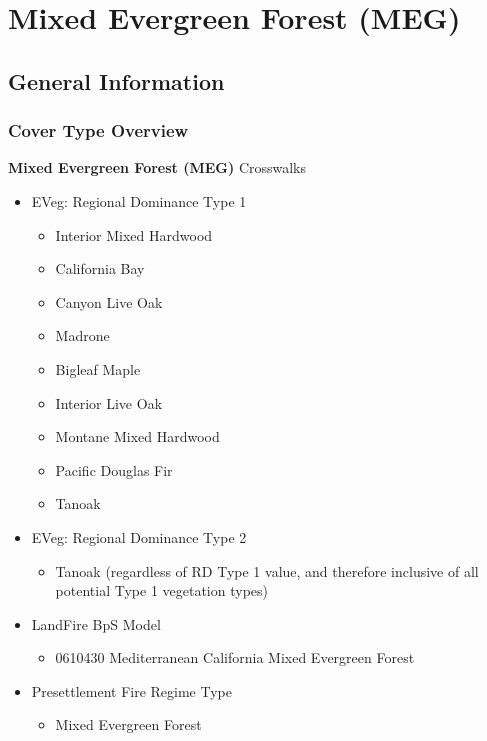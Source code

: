 \newpage
\section{Mixed Evergreen Forest (MEG)}

\subsection*{General Information}

\subsubsection{Cover Type Overview}

\textbf{Mixed Evergreen Forest (MEG)}
\newline
Crosswalks
\begin{itemize}
	\item EVeg: Regional Dominance Type 1
	\begin{itemize}
		\item Interior Mixed Hardwood
		\item California Bay
		\item Canyon Live Oak
		\item Madrone
		\item Bigleaf Maple
		\item Interior Live Oak
		\item Montane Mixed Hardwood 
		\item Pacific Douglas Fir
		\item Tanoak
	\end{itemize}

	\item EVeg: Regional Dominance Type 2
	\begin{itemize}
		\item Tanoak (regardless of RD Type 1 value, and therefore inclusive of all potential Type 1 vegetation types)
	\end{itemize}

	\item LandFire BpS Model
	\begin{itemize}
		\item 0610430 Mediterranean California Mixed Evergreen Forest
	\end{itemize}

	\item Presettlement Fire Regime Type
	\begin{itemize}
		\item Mixed Evergreen Forest
	\end{itemize}
\end{itemize}

